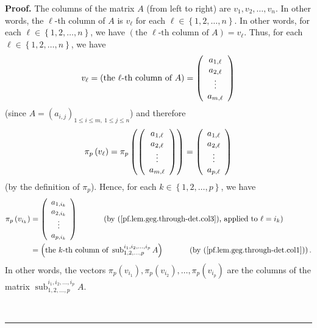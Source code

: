 \documentclass[numbers=enddot,12pt,final,onecolumn,notitlepage]{scrartcl}%
\theoremstyle{definition}
\newenvironment{proof}[1][Proof]{\noindent\textbf{#1.} }{\ \rule{0.5em}{0.5em}}
\renewcommand{\leq}{\leqslant}
\theoremstyle{plainsl}
\begin{document}
\begin{proof}
The columns of the matrix $A$ (from left to right) are $v_{1},v_{2}%
,\ldots,v_{n}$. In other words, the $\ell$-th column of $A$ is $v_{\ell}$ for
each $\ell\in\left\{  1,2,\ldots,n\right\}  $. In other words, for each
$\ell\in\left\{  1,2,\ldots,n\right\}  $, we have $\left(  \text{the }%
\ell\text{-th column of }A\right)  =v_{\ell}$. Thus, for each $\ell\in\left\{
1,2,\ldots,n\right\}  $, we have%
\[
v_{\ell}=\left(  \text{the }\ell\text{-th column of }A\right)  =\left(
\begin{array}
[c]{c}%
a_{1,\ell}\\
a_{2,\ell}\\
\vdots\\
a_{m,\ell}%
\end{array}
\right)
\]
(since $A=\left(  a_{i,j}\right)  _{1\leq i\leq m,\ 1\leq j\leq n}$) and
therefore%
\begin{equation}
\pi_{p}\left(  v_{\ell}\right)  =\pi_{p}\left(  \left(
\begin{array}
[c]{c}%
a_{1,\ell}\\
a_{2,\ell}\\
\vdots\\
a_{m,\ell}%
\end{array}
\right)  \right)  =\left(
\begin{array}
[c]{c}%
a_{1,\ell}\\
a_{2,\ell}\\
\vdots\\
a_{p,\ell}%
\end{array}
\right)  \label{pf.lem.geg.through-det.col3}%
\end{equation}
(by the definition of $\pi_{p}$). Hence, for each $k\in\left\{  1,2,\ldots
,p\right\}  $, we have%
\begin{align*}
\pi_{p}\left(  v_{i_{k}}\right)   &  =\left(
\begin{array}
[c]{c}%
a_{1,i_{k}}\\
a_{2,i_{k}}\\
\vdots\\
a_{p,i_{k}}%
\end{array}
\right)  \ \ \ \ \ \ \ \ \ \ \left(  \text{by
(\ref{pf.lem.geg.through-det.col3}), applied to }\ell=i_{k}\right) \\
&  =\left(  \text{the }k\text{-th column of }\operatorname*{sub}%
\nolimits_{1,2,\ldots,p}^{i_{1},i_{2},\ldots,i_{p}}A\right)
\ \ \ \ \ \ \ \ \ \ \left(  \text{by (\ref{pf.lem.geg.through-det.col1}%
)}\right)  .
\end{align*}
In other words, the vectors $\pi_{p}\left(  v_{i_{1}}\right)  ,\pi_{p}\left(
v_{i_{2}}\right)  ,\ldots,\pi_{p}\left(  v_{i_{p}}\right)  $ are the columns
of the matrix $\operatorname*{sub}\nolimits_{1,2,\ldots,p}^{i_{1},i_{2}%
,\ldots,i_{p}}A$.


\end{proof}
\end{document}
